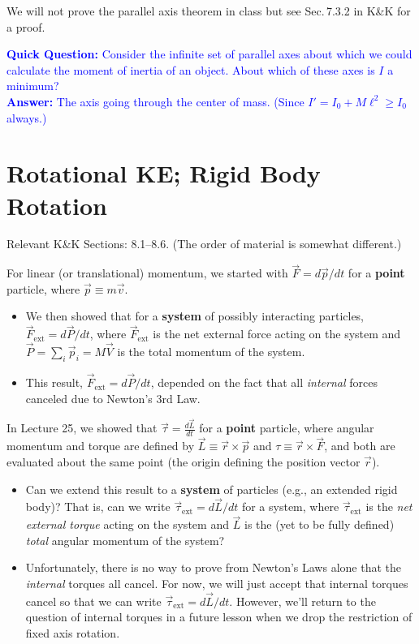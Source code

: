 \documentclass[11pt, letterpaper, openany]{book}
\begin{document}
We will not prove the parallel axis theorem in class but see Sec.\,7.3.2 in K\&K for a proof.

\textcolor{blue}{\textbf{Quick Question:} Consider the infinite set of parallel axes about which we could calculate the moment of inertia of an object. About which of these axes is $I$ a minimum? \\
\textbf{Answer:} The axis going through the center of mass. (Since $I' = I_0 + M\ell^2 \geq I_0$ always.)}

\chapter{Rotational KE; Rigid Body Rotation}

Relevant K\&K Sections: 8.1--8.6. (The order of material is somewhat different.)

For linear (or translational) momentum, we started with $\vec{F} = d\vec{p}/dt$ for a \textbf{point} particle, where $\vec{p} \equiv m\vec{v}$.
\begin{itemize}
    \item We then showed that for a \textbf{system} of possibly interacting particles, $\vec{F}_{\text{ext}} = d\vec{P}/dt$, where $\vec{F}_{\text{ext}}$ is the net external force acting on the system and $\vec{P} = \sum_i \vec{p}_i = M\vec{V}$ is the total momentum of the system.
    \item This result, $\vec{F}_{\text{ext}} = d\vec{P}/dt$, depended on the fact that all \textit{internal} forces canceled due to Newton's 3rd Law.
\end{itemize}

In Lecture 25, we showed that $\vec{\tau} = \frac{d\vec{L}}{dt}$ for a \textbf{point} particle, where angular momentum and torque are defined by $\vec{L} \equiv \vec{r} \times \vec{p}$ and $\tau \equiv \vec{r} \times \vec{F}$, and both are evaluated about the same point (the origin defining the position vector $\vec{r}$).

\begin{itemize}
    \item Can we extend this result to a \textbf{system} of particles (e.g., an extended rigid body)? That is, can we write $\vec{\tau}_{\text{ext}} = d\vec{L}/dt$ for a system, where $\vec{\tau}_{\text{ext}}$ is the \textit{net external torque} acting on the system and $\vec{L}$ is the (yet to be fully defined) \textit{total} angular momentum of the system?
    \item Unfortunately, there is no way to prove from Newton's Laws alone that the \textit{internal} torques all cancel. For now, we will just accept that internal torques cancel so that we can write $\vec{\tau}_{\text{ext}} = d\vec{L}/dt$. However, we'll return to the question of internal torques in a future lesson when we drop the restriction of fixed axis rotation.
\end{itemize}
\end{document}

